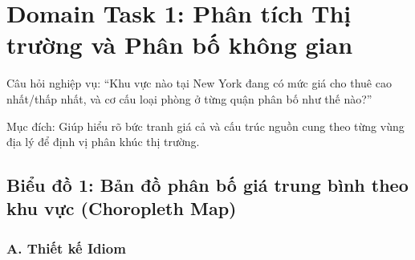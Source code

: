 \section{Domain Task 1: Phân tích Thị trường và Phân bố không gian}

Câu hỏi nghiệp vụ: ``Khu vực nào tại New York đang có mức giá cho thuê
cao nhất/thấp nhất, và cơ cấu loại phòng ở từng quận phân bố như thế nào?''

Mục đích: Giúp hiểu rõ bức tranh giá cả và cấu trúc nguồn cung theo từng
vùng địa lý để định vị phân khúc thị trường.

\subsection{Biểu đồ 1: Bản đồ phân bố giá trung bình theo khu vực (Choropleth Map)}

\subsubsection*{A. Thiết kế Idiom}

